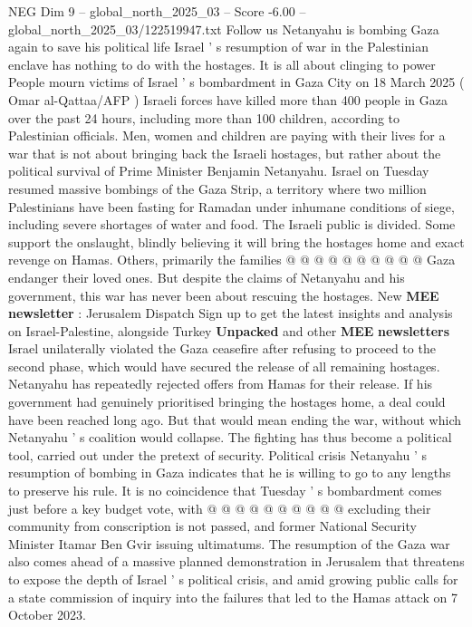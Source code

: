 \begin{textsample}{NEG Dim 9 – global\_north\_2025\_03 – Score -6.00 – global\_north\_2025\_03/122519947.txt}  \label{ex:f9_neg_074}
Follow us Netanyahu is bombing Gaza again to save his political life Israel ' s resumption of war in the Palestinian enclave has nothing to do with the hostages.
It is all about clinging to power People mourn victims of Israel ' s bombardment in Gaza City on 18 March 2025 ( Omar al-Qattaa/AFP ) Israeli forces have killed more than 400 people in Gaza over the past 24 hours, including more than 100 children, according to Palestinian officials.
Men, women and children are paying with their lives for a war that is not about bringing back the Israeli hostages, but rather about the political survival of Prime Minister Benjamin Netanyahu.
Israel on Tuesday resumed massive bombings of the Gaza Strip, a territory where two million Palestinians have been fasting for Ramadan under inhumane conditions of siege, including severe shortages of water and food.
The Israeli public is divided.
Some support the onslaught, blindly believing it will bring the hostages home and exact revenge on Hamas.
Others, primarily the families @ @ @ @ @ @ @ @ @ @ Gaza endanger their loved ones.
But despite the claims of Netanyahu and his government, this war has never been about rescuing the hostages.
New \textbf{MEE} \textbf{newsletter} : Jerusalem Dispatch Sign up to get the latest insights and analysis on Israel-Palestine, alongside Turkey \textbf{Unpacked} and other \textbf{MEE} \textbf{newsletters} Israel unilaterally violated the Gaza ceasefire after refusing to proceed to the second phase, which would have secured the release of all remaining hostages.
Netanyahu has repeatedly rejected offers from Hamas for their release.
If his government had genuinely prioritised bringing the hostages home, a deal could have been reached long ago.
But that would mean ending the war, without which Netanyahu ' s coalition would collapse.
The fighting has thus become a political tool, carried out under the pretext of security.
Political crisis Netanyahu ' s resumption of bombing in Gaza indicates that he is willing to go to any lengths to preserve his rule.
It is no coincidence that Tuesday ' s bombardment comes just before a key budget vote, with @ @ @ @ @ @ @ @ @ @ excluding their community from conscription is not passed, and former National Security Minister Itamar Ben Gvir issuing ultimatums.
The resumption of the Gaza war also comes ahead of a massive planned demonstration in Jerusalem that threatens to expose the depth of Israel ' s political crisis, and amid growing public calls for a state commission of inquiry into the failures that led to the Hamas attack on 7 October 2023.

\end{textsample}
